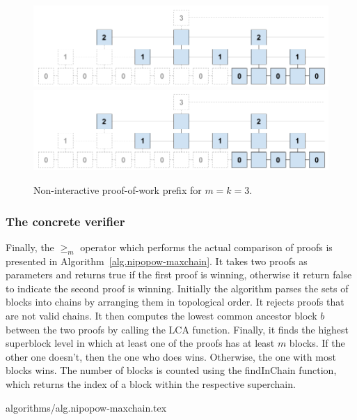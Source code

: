 \begin{figure}[h]
    \caption{Non-interactive proof-of-work prefix for $m=k = 3$.}
    \centering
    \iftwocolumn
        \includegraphics[width=\columnwidth,keepaspectratio]{figures/non-interactive-popow.png}
    \else
        \includegraphics[width=0.7\columnwidth,keepaspectratio]{figures/non-interactive-popow.png}
    \fi
    \label{fig.nipopow}
\end{figure}

\subsubsection{The concrete verifier}

Finally, the $\geq_m$ operator which performs the actual comparison of proofs
is presented in Algorithm~\ref{alg.nipopow-maxchain}. It takes two proofs as
parameters and returns true if the first proof is winning, otherwise it return
false to indicate the second proof is winning. Initially the algorithm parses
the sets of blocks into chains by arranging them in topological order. It
rejects proofs that are not valid chains. It then computes the lowest common
ancestor block $b$ between the two proofs by calling the LCA function. Finally,
it finds the highest superblock level in which at least one of the proofs has
at least $m$ blocks. If the other one doesn't, then the one who does wins.
Otherwise, the one with most blocks wins. The number of blocks is counted using
the findInChain function, which returns the index of a block within the
respective superchain.

{algorithms/alg.nipopow-maxchain.tex}
